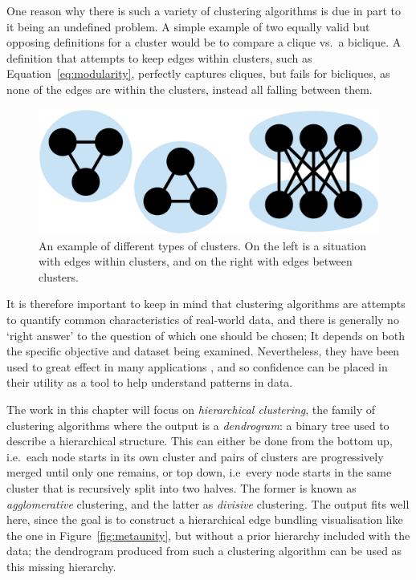 One reason why there is such a variety of clustering algorithms is due in part to it being an undefined problem. A simple example of two equally valid but opposing definitions for a cluster would be to compare a clique vs.\ a biclique. A definition that attempts to keep edges within clusters, such as Equation~\ref{eq:modularity}, perfectly captures cliques, but fails for bicliques, as none of the edges are within the clusters, instead all falling between them.
\begin{figure}
  \centering
  \includegraphics[width=.8\textwidth]{power/clique_vs_biclique.pdf}
  \caption[Two examples for why clustering is difficult to define]{An example of different types of clusters. On the left is a situation with edges within clusters, and on the right with edges between clusters.}
  \label{fig:clique_vs_biclique}
\end{figure}
It is therefore important to keep in mind that clustering algorithms are attempts to quantify common characteristics of real-world data, and there is generally no `right answer' to the question of which one should be chosen; It depends on both the specific objective and dataset being examined. 
Nevertheless, they have been used to great effect in many applications \cite{Fortunato2016}, and so confidence can be placed in their utility as a tool to help understand patterns in data.

The work in this chapter will focus on \emph{hierarchical clustering}, the family of clustering algorithms where the output is a \textit{dendrogram}: a binary tree used to describe a hierarchical structure.
This can either be done from the bottom up, i.e.\ each node starts in its own cluster and pairs of clusters are progressively merged until only one remains, or top down, i.e\ every node starts in the same cluster that is recursively split into two halves. The former is known as \emph{agglomerative} clustering, and the latter as \emph{divisive} clustering.
The output fits well here, since the goal is to construct a hierarchical edge bundling visualisation like the one in Figure~\ref{fig:metaunity}, but without a prior hierarchy included with the data; the dendrogram produced from such a clustering algorithm can be used as this missing hierarchy.

